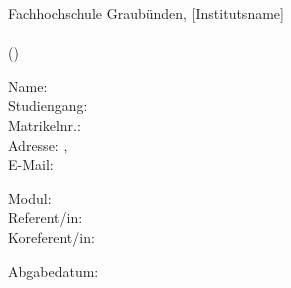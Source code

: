 \begin{titlepage}
    
    \begin{center}
        Fachhochschule Graubünden, [Institutsname] \\
        \vspace{30mm}
        \huge\textbf{\haupttitel}\\
        \hfill \break
        \large{(\untertitel)}
    \end{center}
    
    \vfill
    
    \begin{flushleft}
    Name: \autorenschaft\\
    Studiengang: \studiengang\\
    Matrikelnr.: \matrikelnummer\\
    Adresse: \adresse, \plz~\ort\\
    E-Mail: \email\\
    \end{flushleft}
    
    \vspace{0mm}
    
    \begin{flushleft}
    Modul: \modul\\
    Referent/in: \\
    Koreferent/in: \coRefe\\
    \end{flushleft}
    
    \vspace{0mm}
    
    \begin{flushleft}
    Abgabedatum: \abgabedatum
    \end{flushleft}
    
    \vspace{20mm}
    
\end{titlepage}
